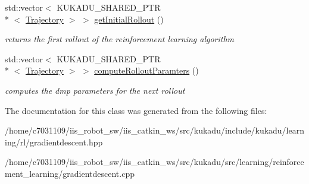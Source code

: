 \begin{DoxyCompactItemize}
\item 
\hypertarget{classkukadu_1_1GradientDescent_a9a8a9b125c490b1eb93a1f604219fbd6}{std\-::vector$<$ K\-U\-K\-A\-D\-U\-\_\-\-S\-H\-A\-R\-E\-D\-\_\-\-P\-T\-R\\*
$<$ \hyperlink{classkukadu_1_1Trajectory}{Trajectory} $>$ $>$ \hyperlink{classkukadu_1_1GradientDescent_a9a8a9b125c490b1eb93a1f604219fbd6}{get\-Initial\-Rollout} ()}\label{classkukadu_1_1GradientDescent_a9a8a9b125c490b1eb93a1f604219fbd6}

\begin{DoxyCompactList}\small\item\em returns the first rollout of the reinforcement learning algorithm \end{DoxyCompactList}\item 
\hypertarget{classkukadu_1_1GradientDescent_abd9d198e248e55a54a346f97a5cce987}{std\-::vector$<$ K\-U\-K\-A\-D\-U\-\_\-\-S\-H\-A\-R\-E\-D\-\_\-\-P\-T\-R\\*
$<$ \hyperlink{classkukadu_1_1Trajectory}{Trajectory} $>$ $>$ \hyperlink{classkukadu_1_1GradientDescent_abd9d198e248e55a54a346f97a5cce987}{compute\-Rollout\-Paramters} ()}\label{classkukadu_1_1GradientDescent_abd9d198e248e55a54a346f97a5cce987}

\begin{DoxyCompactList}\small\item\em computes the dmp parameters for the next rollout \end{DoxyCompactList}\end{DoxyCompactItemize}


The documentation for this class was generated from the following files\-:\begin{DoxyCompactItemize}
\item 
/home/c7031109/iis\-\_\-robot\-\_\-sw/iis\-\_\-catkin\-\_\-ws/src/kukadu/include/kukadu/learning/rl/gradientdescent.\-hpp\item 
/home/c7031109/iis\-\_\-robot\-\_\-sw/iis\-\_\-catkin\-\_\-ws/src/kukadu/src/learning/reinforcement\-\_\-learning/gradientdescent.\-cpp\end{DoxyCompactItemize}
